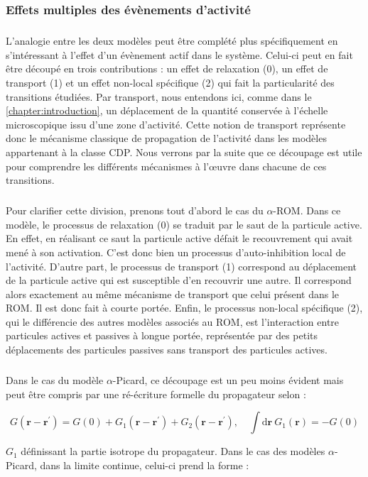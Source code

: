 \subsubsection{Effets multiples des évènements d'activité}

\subparagraph{}L'analogie entre les deux modèles peut être complété plus spécifiquement en s'intéressant à  l'effet d'un évènement actif dans le système. Celui-ci peut en fait être découpé en trois contributions : un effet de relaxation (0), un effet de transport (1) et un effet non-local spécifique (2) qui fait la particularité des transitions étudiées. Par transport, nous entendons ici, comme dans le \autoref{chapter:introduction}, un déplacement de la quantité conservée à l'échelle microscopique issu d'une zone d'activité. Cette notion de transport représente donc le mécanisme classique de propagation de l'activité dans les modèles appartenant à la classe CDP. Nous verrons par la suite que ce découpage est utile pour comprendre les différents mécanismes à l’œuvre dans chacune de ces transitions.

\subparagraph{}Pour clarifier cette division, prenons tout d'abord le cas du $\alpha$-ROM. Dans ce modèle, le processus de relaxation (0) se traduit par le saut de la particule active. En effet, en réalisant ce saut la particule active défait le recouvrement qui avait mené à son activation. C'est donc bien un processus d'auto-inhibition local de l'activité. D'autre part, le processus de transport (1) correspond au déplacement de la particule active qui est susceptible d'en recouvrir une autre. Il correspond alors exactement au même mécanisme de transport que celui présent dans le ROM. Il est donc fait à courte portée. Enfin, le processus non-local spécifique (2), qui le différencie des autres modèles associés au ROM, est l'interaction entre particules actives et passives à longue portée, représentée par des petits déplacements des particules passives sans transport des particules actives. 

\subparagraph{}Dans le cas du modèle $\alpha$-Picard, ce découpage est un peu moins évident mais peut être compris par une ré-écriture formelle du propagateur selon :

\begin{equation}
	G(\mathbf{r}-\mathbf{r}^\prime) = G(0) + G_1(\mathbf{r}-\mathbf{r}^\prime) + G_2(\mathbf{r}-\mathbf{r}^\prime), \quad \int \mathrm{d}\mathbf{r}~ G_1(\mathbf{r}) = -G(0)
\end{equation}

\noindent $G_1$ définissant la partie isotrope du propagateur. Dans le cas des modèles $\alpha$-Picard, dans la limite continue, celui-ci prend la forme :

